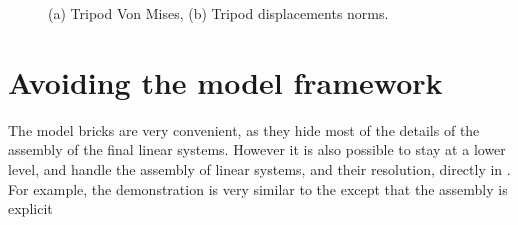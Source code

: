 \documentclass[a4paper,11pt,english]{sphinxmanual}
\begin{document}
\begin{figure}[htbp]
\centering
\capstart

\noindent{}
\caption{(a) Tripod Von Mises, (b) Tripod displacements norms.}\label{\detokenize{python/examples:id3}}\end{figure}


\section{Avoiding the model framework}
\label{\detokenize{python/examples:avoiding-the-model-framework}}
The model bricks are very convenient, as they hide most of the details of the
assembly of the final linear systems. However it is also possible to stay at a
lower level, and handle the assembly of linear systems, and their resolution,
directly in . For example, the demonstration  is
very similar to the  except that the assembly is explicit
\end{document}
